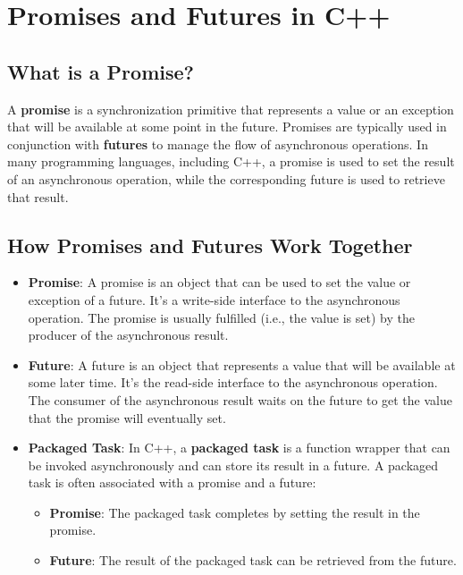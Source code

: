 \documentclass{article}
\begin{document}
\section{Promises and Futures in C++}
\subsection{What is a Promise?}
A \textbf{promise} is a synchronization primitive that represents a value or an exception that will be available at some point in the future. Promises are typically used in conjunction with \textbf{futures} to manage the flow of asynchronous operations. In many programming languages, including C++, a promise is used to set the result of an asynchronous operation, while the corresponding future is used to retrieve that result.

\subsection{How Promises and Futures Work Together}
\begin{itemize}
    \item \textbf{Promise}: A promise is an object that can be used to set the value or exception of a future. It's a write-side interface to the asynchronous operation. The promise is usually fulfilled (i.e., the value is set) by the producer of the asynchronous result.
    \item \textbf{Future}: A future is an object that represents a value that will be available at some later time. It's the read-side interface to the asynchronous operation. The consumer of the asynchronous result waits on the future to get the value that the promise will eventually set.
    \item \textbf{Packaged Task}: In C++, a \textbf{packaged task} is a function wrapper that can be invoked asynchronously and can store its result in a future. A packaged task is often associated with a promise and a future:
    \begin{itemize}
        \item \textbf{Promise}: The packaged task completes by setting the result in the promise.
        \item \textbf{Future}: The result of the packaged task can be retrieved from the future.
    \end{itemize}
\end{itemize}
\end{document}
